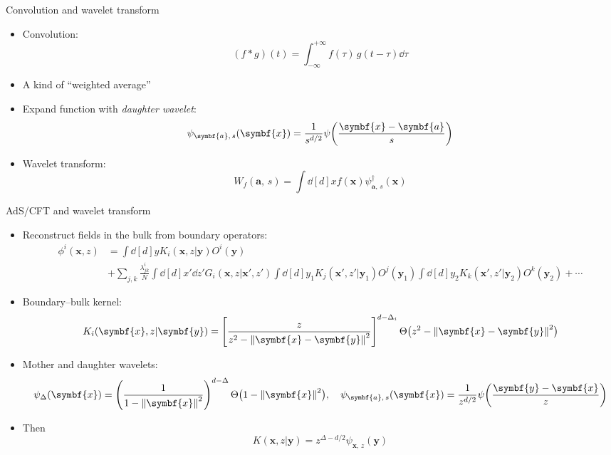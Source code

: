 \documentclass[aspectratio=169]{beamer}
\def\opO{O}
\def\bm#1{{\symbf{#1}}}
\def\AdSCFT{AdS/CFT}
\begin{document}
\begin{frame}{Convolution and wavelet transform}
\begin{itemize}
  \item Convolution:
    \[ (f \ast g) (t) = \int_{-\infty}^{+\infty} f(\tau) \, g(t-\tau) \dd{\tau} \]
  \item A kind of ``weighted average''
  \item Expand function with \emph{daughter wavelet}:
    \[ \psi_{\bm{a},\,s}(\bm{x}) = \frac{1}{s^{d/2}} \psi\qty(\frac{\bm{x}-\bm{a}}{s}) \]
  \item Wavelet transform:
    \[ W_f(\bm{a},\,s) = \int \dd[d]{x} f(\bm{x}) \psi^\dagger_{\bm{a},\,s}(\bm{x}) \]
\end{itemize}
\end{frame}

\begin{frame}{\AdSCFT{} and wavelet transform}
\begin{itemize}
  \item Reconstruct fields in the bulk from boundary operators:
    \begingroup\footnotesize
      \begin{align*}
           \phi^i(\bm{x},z)
        &= \int \dd[d]{y} K_i(\bm{x},z|\bm{y}) \opO^i(\bm{y}) \\
        &+ \sum_{j,k} \frac{\lambda^i_{jk}}{N}
             \int \dd[d]{x'} \dd{z'} G_i(\bm{x},z|\bm{x}'\!,z')
             \int \dd[d]{y_1} K_j(\bm{x}'\!,z'|\bm{y}_1) \opO^j(\bm{y}_1)
             \int \dd[d]{y_2} K_k(\bm{x}'\!,z'|\bm{y}_2) \opO^k(\bm{y}_2) + \cdots
      \end{align*}
    \endgroup
  \item Boundary--bulk kernel:
    \begingroup\footnotesize
      \[
        K_i(\bm{x},z|\bm{y})
        = \qty[\frac{z}{z^2-\norm{\bm{x}-\bm{y}}^2}]^{d-\Delta_i} \,
          \Theta\qty\big(z^2-\norm{\bm{x}-\bm{y}}^2)
      \]
    \endgroup
  \item Mother and daughter wavelets:
    \begingroup\footnotesize
      \[
        \psi_\Delta(\bm{x}) = \qty(\frac{1}{1-\norm{\bm{x}}^2})^{d-\Delta} \,
                              \Theta\qty\big(1-\norm{\bm{x}}^2) \qc
        \psi_{\bm{a},\,s}(\bm{x})
        = \frac{1}{z^{d/2}} \psi\qty(\frac{\bm{y}-\bm{x}}{z})
      \]
    \endgroup
  \item Then
    \begingroup\footnotesize
      \[ K(\bm{x},z|\bm{y}) = z^{\Delta-d/2} \psi_{\bm{x},\,z}(\bm{y}) \]
    \endgroup
\end{itemize}
\end{frame}
\end{document}
